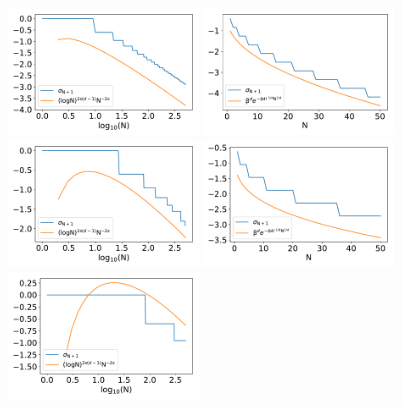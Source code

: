 \documentclass[twoside,11pt]{book}
\numberwithin{theorem}{chapter}
\numberwithin{definition}{chapter}
\numberwithin{proposition}{chapter}
\numberwithin{corollary}{chapter}
\numberwithin{example}{chapter}
\numberwithin{lemma}{chapter}
\numberwithin{assumption}{chapter}
\numberwithin{equation}{chapter}
\numberwithin{figure}{chapter}
\begin{document}
\begin{figure}[]
    \centering
\includegraphics[width= 0.45\textwidth]{img/neurips/multiSobolev/comparison/Korobov_2D_ko_1_eig_comparison.pdf} 
\includegraphics[width= 0.45\textwidth]{img/neurips/multiHermite/comparison/Gaussian_2D_scale_1_eig_comparison.pdf} \\
\includegraphics[width= 0.45\textwidth]{img/neurips/multiSobolev/comparison/Korobov_3D_ko_1_eig_comparison.pdf} 
\includegraphics[width= 0.45\textwidth]{img/neurips/multiHermite/comparison/Gaussian_3D_scale_1_eig_comparison.pdf}\\
\includegraphics[width= 0.45\textwidth]{img/neurips/multiSobolev/comparison/Korobov_4D_ko_1_eig_comparison.pdf} 

\end{figure}
\end{document}
